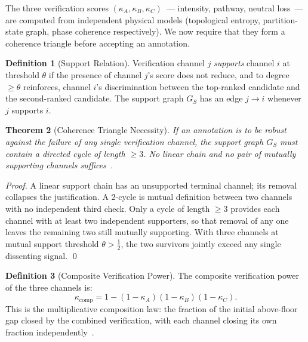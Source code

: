 \documentclass[twocolumn,10pt,a4paper]{article}
\theoremstyle{thmstyle}
\newtheorem{theorem}{Theorem}[section]
\theoremstyle{definition}
\newtheorem{definition}[theorem]{Definition}
\theoremstyle{remark}
\begin{document}
The three verification scores
$(\kappa_A, \kappa_B, \kappa_C)$~--- intensity, pathway, neutral
loss~--- are computed from independent physical models (topological
entropy, partition-state graph, phase coherence respectively). We now
require that they form a coherence triangle before accepting an
annotation.

\begin{definition}[Support Relation]
\label{def:support}
Verification channel $j$ \emph{supports} channel $i$ at threshold
$\theta$ if the presence of channel $j$'s score does not reduce, and
to degree $\ge \theta$ reinforces, channel $i$'s discrimination between
the top-ranked candidate and the second-ranked candidate. The support
graph $G_S$ has an edge $j \to i$ whenever $j$ supports $i$.
\end{definition}

\begin{theorem}[Coherence Triangle Necessity]
\label{thm:triangle}
If an annotation is to be robust against the failure of any single
verification channel, the support graph $G_S$ must contain a directed
cycle of length $\ge 3$. No linear chain and no pair of mutually
supporting channels suffices~\citep{sachikonye2024scp}.
\end{theorem}

\begin{proof}
A linear support chain has an unsupported terminal channel; its removal
collapses the justification. A 2-cycle is mutual definition between
two channels with no independent third check. Only a cycle of length
$\ge 3$ provides each channel with at least two independent supporters,
so that removal of any one leaves the remaining two still mutually
supporting. With three channels at mutual support threshold
$\theta > \tfrac{1}{2}$, the two survivors jointly exceed any single
dissenting signal. \qed
\end{proof}

\begin{definition}[Composite Verification Power]
\label{def:composite}
The composite verification power of the three channels is:
\begin{equation}
\kappa_{\mathrm{comp}} = 1 - (1 - \kappa_A)(1 - \kappa_B)(1 - \kappa_C).
\label{eq:composite}
\end{equation}
This is the multiplicative composition law: the fraction of the
initial above-floor gap closed by the combined verification, with
each channel closing its own fraction
independently~\citep{sachikonye2024scp}.
\end{definition}
\end{document}
